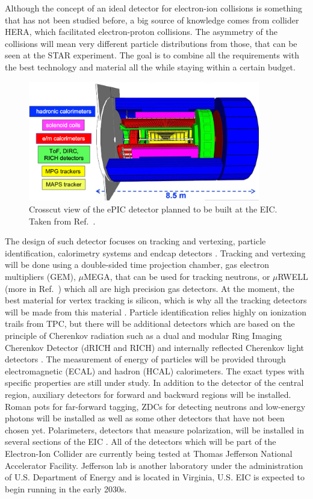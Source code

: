 \newline
Although the concept of an ideal detector for electron-ion collisions is something that has not been studied before, a big source of knowledge comes from collider HERA, which facilitated electron-proton collisions. The asymmetry of the collisions will mean very different particle distributions from those, that can be seen at the STAR experiment. The goal is to combine all the requirements with the best technology and material all the while staying within a certain budget. 
\FloatBarrier
\begin{figure}[ht]
    \centering
    \includegraphics[width=0.9\textwidth]{figures/epic.png}
    \caption[Schematic view of the ePIC detector]{Crosscut view of the ePIC detector planned to be built at the EIC. Taken from Ref.~\cite{EIC}.}
    \label{df3}
\end{figure}
\FloatBarrier
The design of such detector focuses on tracking and vertexing, particle identification, calorimetry systems and endcap detectors \cite{EICdetectorrequirements}. Tracking and vertexing will be done using a double-sided time projection chamber, gas electron multipliers (GEM), $\mu$MEGA, that can be used for tracking neutrons, or $\mu$RWELL (more in Ref.~\cite{muWELL}) which all are high precision gas detectors. At the moment, the best material for vertex tracking is silicon, which is why all the tracking detectors will be made from this material \cite{Higinbotham}. Particle identification relies highly on ionization trails from TPC, but there will be additional detectors which are based on the principle of Cherenkov radiation such as a dual and modular Ring Imaging Cherenkov Detector (dRICH and RICH) and internally reflected Cherenkov light detectors \cite{EICdetectorrequirements}. The measurement of energy of particles will be provided through electromagnetic (ECAL) and hadron (HCAL) calorimeters. The exact types with specific properties are still under study. In addition to the detector of the central region, auxiliary detectors for forward and backward regions will be installed. Roman pots for far-forward tagging, ZDCs for detecting neutrons and low-energy photons will be installed as well as some other detectors that have not been chosen yet. Polarimeters, detectors that measure polarization, will be installed in several sections of the EIC \cite{EICdetectorrequirements}. All of the detectors which will be part of the Electron-Ion Collider are currently being tested at Thomas Jefferson National Accelerator Facility. Jefferson lab is another laboratory under the administration of U.S. Department of Energy and is located in Virginia, U.S. EIC is expected to begin running in the early 2030s.
